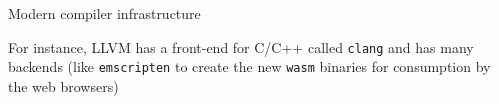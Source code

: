 \documentclass[compress]{beamer}
\begin{document}
%
%
%
%
%
%

\begin{frame}{Modern compiler infrastructure}
    \begin{center}
    \end{center}

    For instance, LLVM has a front-end for C/C++ called \texttt{clang} and has
    many backends (like \texttt{emscripten} to create the new \texttt{wasm}
    binaries for consumption by the web browsers)
\end{frame}
\end{document}
